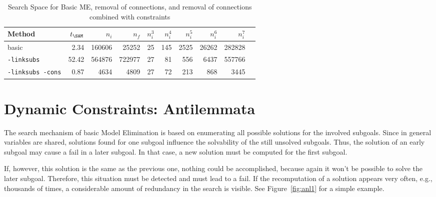 \begin{table}[htb]
\begin{center}
\begin{tabular}{|l|r|r|r||r|r|r|r|r|r|}
\hline
Method & $t_{\SAM}$ & $n_i$ & $n_f$ & 
	$n_i^3$ & $n_i^4$ & $n_i^5$ & $n_i^6$ & $n_i^7$ \\
\hline\hline
basic & 2.34 & 160606 & 25252 &
	25 & 145 & 2525 & 26262 & 282828 \\
\hline
{\tt -linksubs} & 52.42 & 564876 & 722977 &
	27 & 81 & 556 & 6437 & 557766 \\
\hline
{\tt -linksubs -cons} & 0.87 & 4634 & 4809 &
	27 & 72 & 213 & 868 & 3445 \\
\hline\hline
\end{tabular}
\end{center}
\caption{Search Space for Basic ME, removal of connections, and removal of connections
combined with constraints}
\label{tab:tut2:results.linksubs}
\end{table}


\section{Dynamic Constraints: Antilemmata}

The search mechanism of basic Model Elimination is based on enumerating all
possible solutions for the involved subgoals. Since in general
variables are shared, solutions found for one subgoal 
influence the solvability of the still unsolved subgoals. Thus,
the solution of an early subgoal may cause a fail in a later subgoal. 
In that case, a new solution must be computed for the first subgoal.

If, however, this solution is the same as the previous one,
nothing could be accomplished, because again it won't be possible to
solve the later subgoal.
Therefore, this situation must be detected and must lead to a fail.
If the recomputation of a solution
appears very often, e.g., thousands of times, 
a considerable amount of redundancy in the search is visible. 
See Figure~\ref{fig:anl1} for a simple example. 

%


